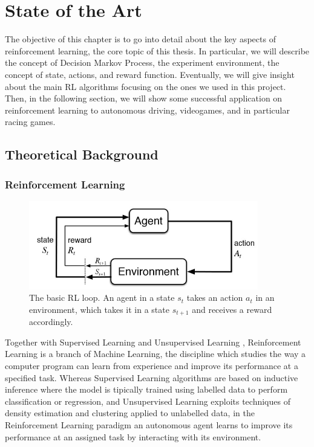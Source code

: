 \chapter{State of the Art}
\label{State of the Art}
\thispagestyle{empty}


The objective of this chapter is to go into detail about the key aspects of reinforcement learning, the core topic of this thesis. In particular, we will describe the concept of Decision Markov Process, the experiment environment, the concept of state, actions, and reward function. Eventually, we will give insight about the main RL algorithms focusing on the ones we used in this project.
Then, in the following section, we will show some successful application on reinforcement learning to autonomous driving, videogames, and in particular racing games.

\section{Theoretical Background}

\subsection{Reinforcement Learning}
\begin{figure}[t]
 \centering
  \captionsetup{width=10cm}
  \includegraphics[width=10cm]{./img/rl}
  \caption{The basic RL loop. An agent in a state $s_t$ takes an action $a_t$ in an environment, which takes it in a state $s_{t+1}$ and receives a reward accordingly.}
   \label{fig:rlloop}
\end{figure}
Together with Supervised Learning and Unsupervised Learning \cite{elements}, Reinforcement Learning is a branch of Machine Learning, the discipline which studies the way a computer program can learn from experience and improve its performance at a specified task. Whereas Supervised Learning algorithms are based on inductive inference where the model is tipically trained using labelled data to perform classification or regression, and Unsupervised Learning exploits techniques of density estimation and clustering applied to unlabelled data, in the Reinforcement Learning paradigm an autonomous agent learns to improve its performance at an assigned task by interacting with its environment.

